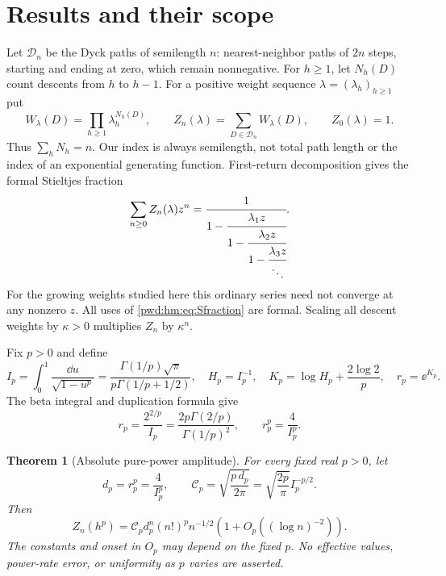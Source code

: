 \documentclass[11pt,letterpaper]{article}
\numberwithin{equation}{section}
\newtheorem{theorem}{Theorem}[section]
\theoremstyle{remark}\newtheorem{remark}[theorem]{Remark}
\newcommand{\Dyck}{\mathcal D}
\begin{document}
\section{Results and their scope}\label{pwd:hm:sec:results}
Let $\Dyck_n$ be the Dyck paths of semilength $n$: nearest-neighbor paths of $2n$ steps, starting and ending at zero, which remain nonnegative. For $h\ge1$, let $N_h(D)$ count descents from $h$ to $h-1$. For a positive weight sequence $\lambda=(\lambda_h)_{h\ge1}$ put
\begin{equation}\label{pwd:hm:eq:definition}
 W_\lambda(D)=\prod_{h\ge1}\lambda_h^{N_h(D)},\qquad
 Z_n(\lambda)=\sum_{D\in\Dyck_n}W_\lambda(D),\qquad Z_0(\lambda)=1.
\end{equation}
Thus $\sum_hN_h=n$. Our index is always semilength, not total path length or the index of an exponential generating function. First-return decomposition gives the formal Stieltjes fraction
\begin{equation}\label{pwd:hm:eq:Sfraction}
 \sum_{n\ge0}Z_n(\lambda)z^n
 =\cfrac{1}{1-\cfrac{\lambda_1z}{1-\cfrac{\lambda_2z}{1-\cfrac{\lambda_3z}{\ddots}}}}.
\end{equation}
For the growing weights studied here this ordinary series need not converge at any nonzero $z$. All uses of \eqref{pwd:hm:eq:Sfraction} are formal. Scaling all descent weights by $\kappa>0$ multiplies $Z_n$ by $\kappa^n$.

Fix $p>0$ and define
\begin{equation}\label{pwd:hm:eq:constants}
 I_p=\int_0^1\frac{\dd u}{\sqrt{1-u^p}}
 =\frac{\Gamma(1/p)\sqrt\pi}{p\Gamma(1/p+1/2)},\quad
 H_p=I_p^{-1},\quad K_p=\log H_p+\frac{2\log2}{p},\quad r_p=\ee^{K_p}.
\end{equation}
The beta integral and duplication formula give
\begin{equation}\label{pwd:hm:eq:rp}
 r_p=\frac{2^{2/p}}{I_p}
 =\frac{2p\Gamma(2/p)}{\Gamma(1/p)^2},\qquad r_p^p=\frac4{I_p^p}.
\end{equation}

\begin{theorem}[Absolute pure-power amplitude]\label{pwd:hm:thm:absolute}
For every fixed real $p>0$, let
\begin{equation}\label{pwd:hm:eq:cpdp}
 d_p=r_p^p=\frac4{I_p^p},\qquad
 \mathcal{C}_p=\sqrt{\frac{p\,d_p}{2\pi}}=\sqrt{\frac{2p}{\pi}}I_p^{-p/2}.
\end{equation}
Then
\begin{equation}\label{pwd:hm:eq:absolute}
 Z_n(h^p)=\mathcal{C}_pd_p^n(n!)^pn^{-1/2}
 \left(1+O_p((\log n)^{-2})\right).
\end{equation}
The constants and onset in $O_p$ may depend on the fixed $p$. No effective values, power-rate error, or uniformity as $p$ varies are asserted.
\end{theorem}
\end{document}
